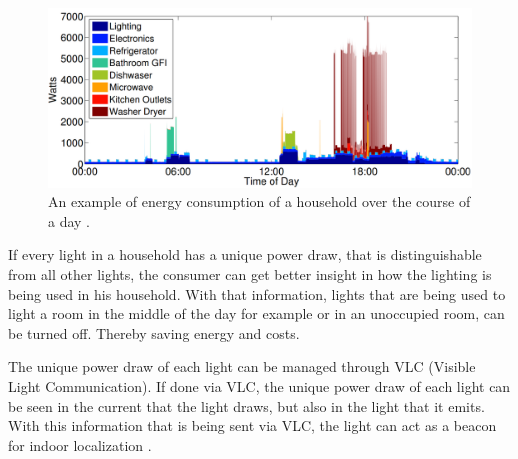 \begin{figure}[t]
	\centering
	\includegraphics[width=\textwidth]{chapters/introduction-chapters/energy-consumption-house.png}
	\caption{An example of energy consumption of a household over the course of a day \cite{kolter2011redd}.}
	\label{fig:energy-consumption-house}
\end{figure}




If every light in a household has a unique power draw, that is distinguishable from all other lights, the consumer can get better insight in how the lighting is being used in his household. 
With that information, lights that are being used to light a room in the middle of the day for example or in an unoccupied room, can be turned off.
Thereby saving energy and costs.


The unique power draw of each light can be managed through VLC (Visible Light Communication).
If done via VLC, the unique power draw of each light can be seen in the current that the light draws, but also in the light that it emits.
With this information that is being sent via VLC, the light can act as a beacon for indoor localization \cite{Kuo:2014:LIP:2639108.2639109}.



















